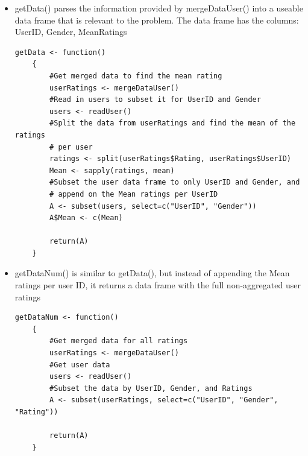 \documentclass[11pt]{article}  %
\begin{document}
\begin{itemize}
    \item getData() parses the information provided by mergeDataUser() into a useable data frame that is relevant to the problem. The data frame has the columns:\\
    UserID, Gender, MeanRatings
    \begin{lstlisting}[basicstyle=\small]
    getData <- function()
    {
    	#Get merged data to find the mean rating
    	userRatings <- mergeDataUser()
    	#Read in users to subset it for UserID and Gender
    	users <- readUser()
    	#Split the data from userRatings and find the mean of the ratings
    	# per user
    	ratings <- split(userRatings$Rating, userRatings$UserID)
    	Mean <- sapply(ratings, mean)
    	#Subset the user data frame to only UserID and Gender, and
    	# append on the Mean ratings per UserID
    	A <- subset(users, select=c("UserID", "Gender"))
    	A$Mean <- c(Mean)
    
    	return(A)
    }
    \end{lstlisting}
    
    \item getDataNum() is similar to getData(), but instead of appending the Mean ratings per user ID, it returns a data frame with the full non-aggregated user ratings
    \begin{lstlisting}[basicstyle=\small]
    getDataNum <- function()
    {
    	#Get merged data for all ratings
    	userRatings <- mergeDataUser()
    	#Get user data
    	users <- readUser()
    	#Subset the data by UserID, Gender, and Ratings
    	A <- subset(userRatings, select=c("UserID", "Gender", "Rating"))
    
    	return(A)
    }
    \end{lstlisting}
\end{itemize}

\end{document}
